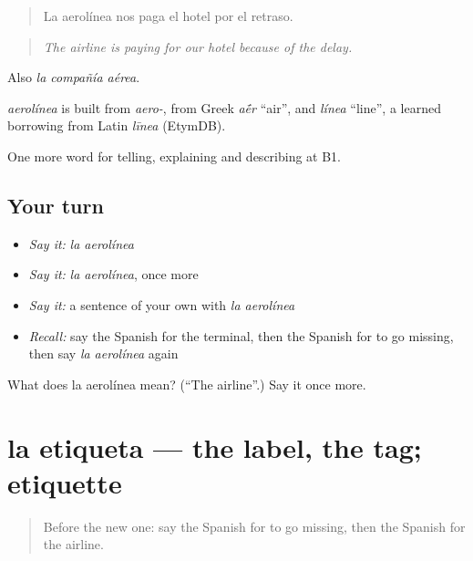 \begin{quote}
La aerolínea nos paga el hotel por el retraso.
\end{quote}

\begin{quote}
\emph{The airline is paying for our hotel because of the delay.}
\end{quote}

Also \emph{la compañía aérea}.

\begin{cousinweb}
\emph{aerolínea} is built from \emph{aero-}, from Greek \emph{a\'{\={e}}r} \textquotedblleft{}air\textquotedblright{}, and \emph{línea} \textquotedblleft{}line\textquotedblright{}, a learned borrowing from Latin \emph{līnea} (EtymDB).
\end{cousinweb}

\begin{grammarlens}[title={What you've built}]
One more word for telling, explaining and describing at B1.
\end{grammarlens}

\subsection*{Your turn}
\begin{itemize}
\raggedright
  \item \emph{Say it:} \emph{la aerolínea}
  \item \emph{Say it:} \emph{la aerolínea}, once more
  \item \emph{Say it:} a sentence of your own with \emph{la aerolínea}
  \item \emph{Recall:} say the Spanish for the terminal, then the Spanish for to go missing, then say \emph{la aerolínea} again
\end{itemize}

\begin{tcolorbox}[breakable,colback=teal!4,colframe=teal!35!black,title={Before you move on}]
What does la aerolínea mean? (\textquotedblleft{}The airline\textquotedblright{}.) Say it once more.
\end{tcolorbox}
\section[la etiqueta]{la etiqueta — the label, the tag; etiquette}

\label{lesson:ES-C652-etiqueta}



\begin{quote}
Before the new one: say the Spanish for to go missing, then the Spanish for the airline.
\end{quote}

